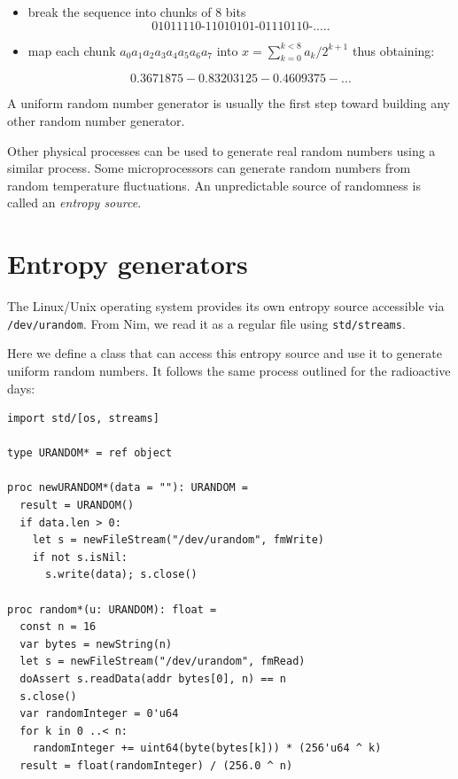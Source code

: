 \documentclass[justified, sixbynine]{tufte-book}
\def\ft{\small\tt}
\theoremstyle{plain}%
\newtheorem * {corollary}{Corollary}
\theoremstyle{definition}
\theoremstyle{remark}
\newtheorem * {remark}{Remark}
\newtheorem * {note}{Note}
\begin{document}
\begin{fullwidth}
\begin{itemize}
\item  break the sequence into chunks of 8 bits
\begin{equation}
\text{01011110-11010101-01110110-.....}
\end{equation}

\item  map each chunk $a_0a_1a_2a_3a_4a_5a_6a_7$ into $x=\sum_{k=0}^{k<8}a_k/2^{k+1}$
thus obtaining:

\begin{equation}
0.3671875 - 0.83203125 - 0.4609375 - ...
\end{equation}
\end{itemize}

A uniform random number generator is usually the first step toward building
any other random number generator.


Other physical processes can be used to generate real random numbers using a similar process.
Some microprocessors can generate random numbers from random temperature fluctuations.
An unpredictable source of randomness is called an {\it entropy source}.

\goodbreak\section{Entropy generators}

The Linux/Unix operating system provides its own entropy source accessible via {\ft /dev/urandom}. From Nim, we read it as a regular file using {\ft std/streams}.

Here we define a class that can access this entropy source and use it to generate uniform random numbers. It follows the same process outlined for the radioactive days:


\begin{lstlisting}
import std/[os, streams]

type URANDOM* = ref object

proc newURANDOM*(data = ""): URANDOM =
  result = URANDOM()
  if data.len > 0:
    let s = newFileStream("/dev/urandom", fmWrite)
    if not s.isNil:
      s.write(data); s.close()

proc random*(u: URANDOM): float =
  const n = 16
  var bytes = newString(n)
  let s = newFileStream("/dev/urandom", fmRead)
  doAssert s.readData(addr bytes[0], n) == n
  s.close()
  var randomInteger = 0'u64
  for k in 0 ..< n:
    randomInteger += uint64(byte(bytes[k])) * (256'u64 ^ k)
  result = float(randomInteger) / (256.0 ^ n)
\end{lstlisting}


\end{fullwidth}
\end{document}
